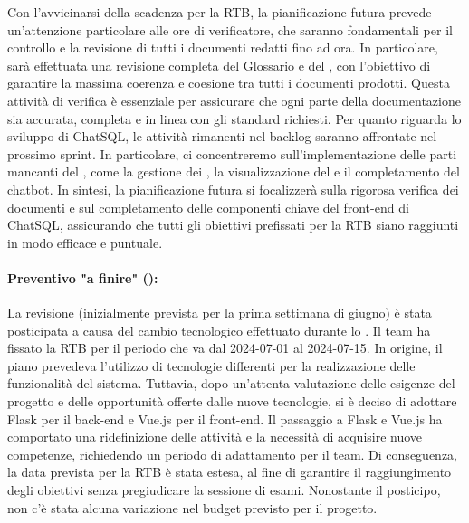 Con l'avvicinarsi della scadenza per la RTB, la pianificazione futura prevede un'attenzione particolare alle ore di verificatore, che saranno fondamentali per il controllo e la revisione di tutti i documenti redatti fino ad ora. In particolare, sarà effettuata una revisione completa del Glossario e del \PdP, con l'obiettivo di garantire la massima coerenza e coesione tra tutti i documenti prodotti. Questa attività di verifica è essenziale per assicurare che ogni parte della documentazione sia accurata, completa e in linea con gli standard richiesti.
Per quanto riguarda lo sviluppo di ChatSQL, le attività rimanenti nel backlog saranno affrontate nel prossimo sprint. In particolare, ci concentreremo sull'implementazione delle parti mancanti del , come la gestione dei , la visualizzazione del  e il completamento del chatbot. 
In sintesi, la pianificazione futura si focalizzerà sulla rigorosa verifica dei documenti e sul completamento delle componenti chiave del front-end di ChatSQL, assicurando che tutti gli obiettivi prefissati per la RTB siano raggiunti in modo efficace e puntuale.



\paragraph*{Preventivo "a finire" ():}
La revisione  (inizialmente prevista per la prima settimana di giugno) è stata posticipata a causa del cambio tecnologico effettuato durante lo . Il team ha fissato la RTB per il periodo che va dal 2024-07-01 al 2024-07-15. In origine, il piano prevedeva l'utilizzo di tecnologie differenti per la realizzazione delle funzionalità del sistema. Tuttavia, dopo un'attenta valutazione delle esigenze del progetto e delle opportunità offerte dalle nuove tecnologie, si è deciso di adottare Flask per il back-end e Vue.js per il front-end. Il passaggio a Flask e Vue.js ha comportato una ridefinizione delle attività e la necessità di acquisire nuove competenze, richiedendo un periodo di adattamento per il team. Di conseguenza, la data prevista per la RTB è stata estesa, al fine di garantire il raggiungimento degli obiettivi senza pregiudicare la sessione di esami. Nonostante il posticipo, non c'è stata alcuna variazione nel budget previsto per il progetto.


